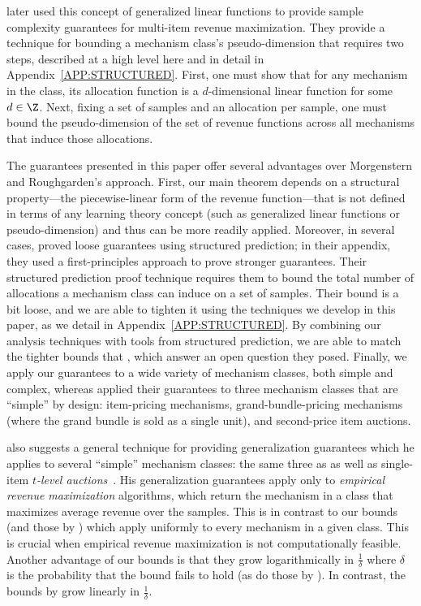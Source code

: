 \citet{Morgenstern16:Learning} later used this concept of generalized linear functions to provide sample complexity guarantees for multi-item revenue maximization.
They provide a technique for bounding a mechanism class's pseudo-dimension that requires two steps, described at a high level here and in detail in Appendix~\ref{APP:STRUCTURED}. First, one must show that for any mechanism in the class, its allocation function is a $d$-dimensional linear function for some $d \in \Z$. Next, fixing a set of samples and an allocation per sample, one must bound the pseudo-dimension of the set of revenue functions across all mechanisms that induce those allocations.
	
The guarantees presented in this paper offer several advantages over Morgenstern and Roughgarden's approach. First, our main theorem depends on a structural property---the piecewise-linear form of the revenue function---that is not defined in terms of any learning theory concept (such as generalized linear functions or pseudo-dimension) and thus can be more readily applied.
Moreover, in several cases, \citet{Morgenstern16:Learning} proved loose guarantees using structured prediction; in their appendix, they used a first-principles approach to prove stronger guarantees.
Their structured prediction proof technique requires them to bound the total number of allocations a mechanism class can induce on a set of samples. Their bound is a bit loose, and we are able to tighten it using the techniques we develop in this paper, as we detail in Appendix~\ref{APP:STRUCTURED}.
By combining our analysis techniques with tools from structured prediction, we are able to match the tighter bounds  that \citet{Morgenstern16:Learning}, which answer an open question they posed. Finally, we apply our guarantees to a wide variety of mechanism classes, both simple and complex, whereas \citet{Morgenstern16:Learning} applied their guarantees to three mechanism classes that are ``simple'' by design: item-pricing mechanisms, grand-bundle-pricing mechanisms (where the grand bundle is sold as a single unit), and second-price item auctions.

 \citet{Syrgkanis17:Sample} also suggests a general technique for providing generalization guarantees which he applies to several ``simple'' mechanism classes: the same three as \citet{Morgenstern16:Learning} as well as single-item \emph{$t$-level auctions}~\citep{Morgenstern15:Pseudo}. His generalization guarantees apply only to \emph{empirical revenue maximization} algorithms, which return the mechanism in a class that maximizes average revenue over the samples. This is in contrast to our bounds (and those by \citet{Morgenstern16:Learning}) which apply uniformly to every mechanism in a given class. This is crucial when empirical revenue maximization is not computationally feasible. Another advantage of our bounds is that they grow logarithmically in $\frac{1}{\delta}$ where $\delta$ is the probability that the bound fails to hold (as do those by \citet{Morgenstern16:Learning}). In contrast, the bounds by \citet{Syrgkanis17:Sample} grow linearly in $\frac{1}{\delta}$.


